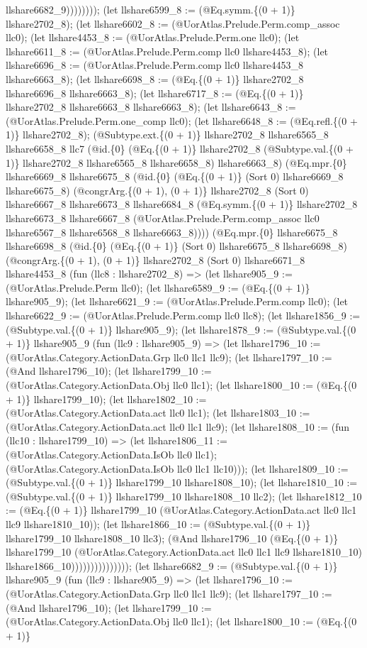 \documentclass[11pt]{article}
\begin{document}
llshare6682\_9)))))))); (let llshare6599\_8 := (@Eq.symm.\{(0 + 1)\} llshare2702\_8); (let llshare6602\_8 := (@UorAtlas.Prelude.Perm.comp\_assoc llc0); (let llshare4453\_8 := (@UorAtlas.Prelude.Perm.one llc0); (let llshare6611\_8 := (@UorAtlas.Prelude.Perm.comp llc0 llshare4453\_8); (let llshare6696\_8 := (@UorAtlas.Prelude.Perm.comp llc0 llshare4453\_8 llshare6663\_8); (let llshare6698\_8 := (@Eq.\{(0 + 1)\} llshare2702\_8 llshare6696\_8 llshare6663\_8); (let llshare6717\_8 := (@Eq.\{(0 + 1)\} llshare2702\_8 llshare6663\_8 llshare6663\_8); (let llshare6643\_8 := (@UorAtlas.Prelude.Perm.one\_comp llc0); (let llshare6648\_8 := (@Eq.refl.\{(0 + 1)\} llshare2702\_8); (@Subtype.ext.\{(0 + 1)\} llshare2702\_8 llshare6565\_8 llshare6658\_8 llc7 (@id.\{0\} (@Eq.\{(0 + 1)\} llshare2702\_8 (@Subtype.val.\{(0 + 1)\} llshare2702\_8 llshare6565\_8 llshare6658\_8) llshare6663\_8) (@Eq.mpr.\{0\} llshare6669\_8 llshare6675\_8 (@id.\{0\} (@Eq.\{(0 + 1)\} (Sort 0) llshare6669\_8 llshare6675\_8) (@congrArg.\{(0 + 1), (0 + 1)\} llshare2702\_8 (Sort 0) llshare6667\_8 llshare6673\_8 llshare6684\_8 (@Eq.symm.\{(0 + 1)\} llshare2702\_8 llshare6673\_8 llshare6667\_8 (@UorAtlas.Prelude.Perm.comp\_assoc llc0 llshare6567\_8 llshare6568\_8 llshare6663\_8)))) (@Eq.mpr.\{0\} llshare6675\_8 llshare6698\_8 (@id.\{0\} (@Eq.\{(0 + 1)\} (Sort 0) llshare6675\_8 llshare6698\_8) (@congrArg.\{(0 + 1), (0 + 1)\} llshare2702\_8 (Sort 0) llshare6671\_8 llshare4453\_8 (fun (llc8 : llshare2702\_8) => (let llshare905\_9 := (@UorAtlas.Prelude.Perm llc0); (let llshare6589\_9 := (@Eq.\{(0 + 1)\} llshare905\_9); (let llshare6621\_9 := (@UorAtlas.Prelude.Perm.comp llc0); (let llshare6622\_9 := (@UorAtlas.Prelude.Perm.comp llc0 llc8); (let llshare1856\_9 := (@Subtype.val.\{(0 + 1)\} llshare905\_9); (let llshare1878\_9 := (@Subtype.val.\{(0 + 1)\} llshare905\_9 (fun (llc9 : llshare905\_9) => (let llshare1796\_10 := (@UorAtlas.Category.ActionData.Grp llc0 llc1 llc9); (let llshare1797\_10 := (@And llshare1796\_10); (let llshare1799\_10 := (@UorAtlas.Category.ActionData.Obj llc0 llc1); (let llshare1800\_10 := (@Eq.\{(0 + 1)\} llshare1799\_10); (let llshare1802\_10 := (@UorAtlas.Category.ActionData.act llc0 llc1); (let llshare1803\_10 := (@UorAtlas.Category.ActionData.act llc0 llc1 llc9); (let llshare1808\_10 := (fun (llc10 : llshare1799\_10) => (let llshare1806\_11 := (@UorAtlas.Category.ActionData.IsOb llc0 llc1); (@UorAtlas.Category.ActionData.IsOb llc0 llc1 llc10))); (let llshare1809\_10 := (@Subtype.val.\{(0 + 1)\} llshare1799\_10 llshare1808\_10); (let llshare1810\_10 := (@Subtype.val.\{(0 + 1)\} llshare1799\_10 llshare1808\_10 llc2); (let llshare1812\_10 := (@Eq.\{(0 + 1)\} llshare1799\_10 (@UorAtlas.Category.ActionData.act llc0 llc1 llc9 llshare1810\_10)); (let llshare1866\_10 := (@Subtype.val.\{(0 + 1)\} llshare1799\_10 llshare1808\_10 llc3); (@And llshare1796\_10 (@Eq.\{(0 + 1)\} llshare1799\_10 (@UorAtlas.Category.ActionData.act llc0 llc1 llc9 llshare1810\_10) llshare1866\_10))))))))))))))); (let llshare6682\_9 := (@Subtype.val.\{(0 + 1)\} llshare905\_9 (fun (llc9 : llshare905\_9) => (let llshare1796\_10 := (@UorAtlas.Category.ActionData.Grp llc0 llc1 llc9); (let llshare1797\_10 := (@And llshare1796\_10); (let llshare1799\_10 := (@UorAtlas.Category.ActionData.Obj llc0 llc1); (let llshare1800\_10 := (@Eq.\{(0 + 1)\} 
\end{document}
